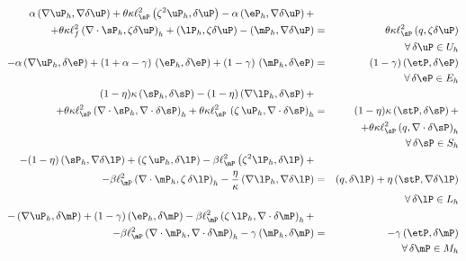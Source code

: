 \begin{eqnarray}
	\alpha \left ( \nabla \uP_h, \nabla \delta \uP \right ) + \theta \kappa \ell_{\sP}^2  \left ( \zeta^2 \uP_h, \delta \uP \right ) - \alpha \left ( \eP_h,\nabla \delta \uP \right ) + & & \nonumber \\ 
	 + \theta \kappa \ell_f^2  \left ( \nabla \cdot \sP_h, \zeta \delta \uP \right )_h + \left ( \lP_h, \zeta\delta \uP \right ) - \left ( \mP_h, \nabla \delta \uP \right ) & = & \theta \kappa \ell_{\sP}^2  \left ( q, \zeta\delta \uP \right )\nonumber \\ & & \quad \forall \,\delta \uP \in U_h  \label{eq:var1h} \\ 
	-\alpha \left ( \nabla \uP_h, \delta \eP \right ) +(1+\alpha-\gamma)\,\left ( \eP_h,\delta \eP \right )+ (1-\gamma)\, \left ( \mP_h, \delta \eP \right ) &=& \left (1-\gamma)\,( \etP, \delta \eP \right )  \nonumber \\ & &\quad \forall \,\delta \eP \in E_h\label{eq:var2h}\\
	(1-\eta)\kappa \left ( \sP_h, \delta \sP \right ) - (1-\eta)\left ( \nabla \lP_h, \delta \sP \right ) + & & \nonumber \\
	+\theta \kappa \ell_{\sP}^2  \left ( \nabla \cdot \sP_h, \nabla \cdot \delta \sP \right )_h+ \theta \kappa \ell_{\sP}^2 \,\left (\zeta\,\uP_h, \nabla \cdot \delta \sP \right )_h & = & (1-\eta)\kappa \left ( \stP,\delta \sP \right ) + \nonumber \\ & &+\theta \kappa \ell_{\sP}^2  \left ( q , \nabla \cdot \delta \sP \right )_h \nonumber \\ & & \quad \forall\, \delta \sP \in S_h \label{eq:var3h}\\
	-(1-\eta)\left ( \sP_h,\nabla \delta \lP\right ) + \left ( \zeta\,\uP_h,\delta \lP \right ) - \beta \ell_{\mP}^2 \left ( \zeta^2 \lP_h, \delta \lP\right )+ & & \nonumber \\
	- \beta \ell_{\mP}^2 \left ( \nabla \cdot \mP_h, \zeta\,\delta \lP \right )_h -\frac{\eta}{\kappa} \left ( \nabla \lP_h , \nabla \delta \lP \right )&=&\left ( q,\delta \lP \right ) + \eta \left ( \stP,\nabla \delta \lP \right ) \nonumber \\ & & \quad \forall\,\delta \lP \in L_h\label{eq:var4h} \\
	-\left (\nabla \uP_h,\delta \mP \right )+(1-\gamma)\left ( \eP_h,\delta \mP \right )
	- \beta \ell_{\mP}^2 \left ( \zeta\,\lP_h, \nabla \cdot \delta \mP \right )_h + & & \nonumber \\- \beta \ell_{\mP}^2 \left ( \nabla \cdot \mP_h, \nabla \cdot \delta \mP \right )_h - \gamma \left ( \mP_h,\delta \mP \right ) & = & -\gamma \left (\etP,\delta \mP \right ) \nonumber \\ & & \quad \forall\,\delta \mP \in M_h \label{eq:var5h}
\end{eqnarray}

